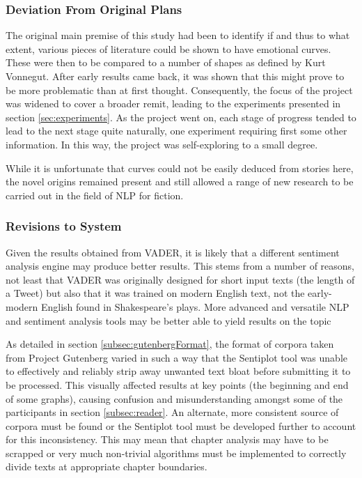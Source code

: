 \documentclass{article}
\begin{document}
{        \subsubsection{Deviation From Original Plans}
            The original main premise of this study had been to identify if and thus to what extent, various pieces of literature could be shown to have emotional curves. These were then to be compared to a number of shapes as defined by Kurt Vonnegut. After early results came back, it was shown that this might prove to be more problematic than at first thought. Consequently, the focus of the project was widened to cover a broader remit, leading to the experiments presented in section \ref{sec:experiments}. As the project went on, each stage of progress tended to lead to the next stage quite naturally, one experiment requiring first some other information. In this way, the project was self-exploring to a small degree.

            While it is unfortunate that curves could not be easily deduced from stories here, the novel origins remained present and still allowed a range of new research to be carried out in the field of NLP for fiction.
        \subsubsection{Revisions to System}
            Given the results obtained from VADER, it is likely that a different sentiment analysis engine may produce better results. This stems from a number of reasons, not least that VADER was originally designed for short input texts (the length of a Tweet) but also that it was trained on modern English text, not the early-modern English found in Shakespeare's plays. More advanced and versatile NLP and sentiment analysis tools may be better able to yield results on the topic

            As detailed in section \ref{subsec:gutenbergFormat}, the format of corpora taken from Project Gutenberg varied in such a way that the Sentiplot tool was unable to effectively and reliably strip away unwanted text bloat before submitting it to be processed. This visually affected results at key points (the beginning and end of some graphs), causing confusion and misunderstanding amongst some of the participants in section \ref{subsec:reader}. An alternate, more consistent source of corpora must be found or the Sentiplot tool must be developed further to account for this inconsistency. This may mean that chapter analysis may have to be scrapped or very much non-trivial algorithms must be implemented to correctly divide texts at appropriate chapter boundaries.
}
\end{document}
